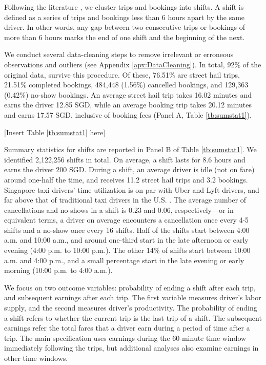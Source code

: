 \documentclass[reviewmode,AEJ]{AEA}
\begin{document}
Following the literature \citep{farber2015you,agarwal2015singaporean,martin2017quit,chen2015dynamic}, we 
cluster trips and bookings into shifts. A shift is defined as a series of trips and bookings less than 6 
hours apart by the same driver. In other words, any gap between two consecutive trips or bookings of more
than 6 hours marks the end of one shift and the beginning of the next. 

We conduct several data-cleaning steps to remove irrelevant or erroneous observations and outliers (see Appendix \ref{apx:DataCleaning}).
In total, %
92\% of the original data, survive this procedure. Of these, 76.51\% are
street hail trips, 21.51\% completed bookings, 484,448 (1.56\%) cancelled bookings, and 129,363 (0.42\%) no-show
bookings. An average street hail trip takes 16.02 minutes and earns the driver 12.85 SGD, while an average  
booking trip takes 20.12 minutes and earns 17.57 SGD, inclusive of booking fees (Panel A, Table \ref{tb:sumstat1}).


\begin{center}
	[Insert Table \ref{tb:sumstat1} here]
\end{center}


Summary statistics for shifts are reported in Panel B of Table \ref{tb:sumstat1}. 
We identified 2,122,256 shifts in total. On average, a shift lasts for 8.6 hours and earns the driver 200 SGD. 
During a shift, an average driver is idle (not on fare) around one-half the time, and receives 11.2 street
hail trips and 3.2 bookings.  Singapore taxi drivers' time utilization is on par with Uber and Lyft drivers,
and far above that of traditional taxi drivers in the U.S. \citep{cramer2016disruptive}.
The average number of cancellations and no-shows in a shift is 0.23 and 0.06, respectively---or in equivalent terms,
a driver on average encounters a cancellation once every 4-5 shifts and a no-show once every 16 shifts.
Half of the shifts start between 4:00 a.m. and 10:00 a.m., and around one-third start in the late afternoon 
or early evening (4:00 p.m. to 10:00 p.m.). The other 14\% of shifts start between 10:00 a.m. and 4:00 p.m.,
and a small percentage start in the late evening or early morning (10:00 p.m. to 4:00 a.m.).

We focus on two outcome variables: probability of ending a shift after each trip, and subsequent earnings after each trip. The first variable measures driver's labor supply, and the second measures driver's productivity. The probability of ending a shift refers to whether the current trip is the last trip of a shift. The subsequent earnings refer the total fares that a driver earn during a period of time after a trip. The main specification uses earnings during the 60-minute time window immediately following the trips, but additional analyses also examine earnings in other time windows. 
\end{document}
